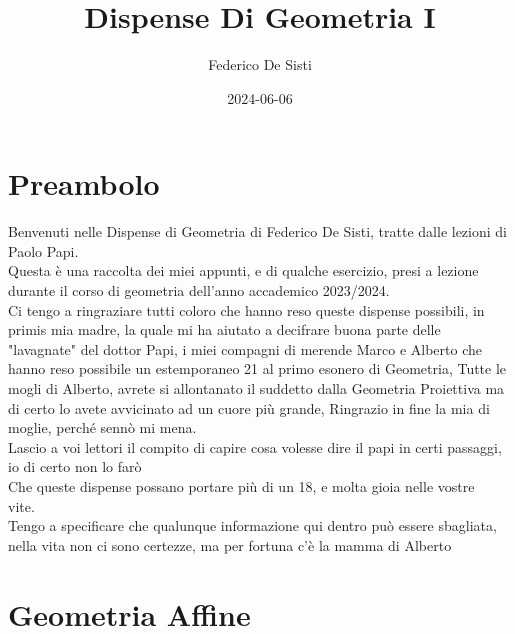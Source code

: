 \documentclass[12px]{article}
\title{Dispense Di Geometria I}
\date{2024-06-06}
\author{Federico De Sisti}
\begin{document}
	\maketitle
	\newpage
	\tableofcontents
	\newpage
	\section{Preambolo}
	Benvenuti nelle Dispense di Geometria di Federico De Sisti, tratte dalle lezioni di Paolo Papi.\\[10px]
	Questa è una raccolta dei miei appunti, e di qualche esercizio, presi a lezione durante il corso di geometria dell'anno accademico 2023/2024.\\[10px]
	Ci tengo a ringraziare tutti coloro che hanno reso queste dispense possibili, in primis mia madre, la quale mi ha aiutato a decifrare buona parte delle "lavagnate" del dottor Papi, i miei compagni di merende Marco e Alberto che hanno reso possibile un estemporaneo 21 al primo esonero di Geometria, Tutte le mogli di Alberto, avrete si allontanato il suddetto dalla Geometria Proiettiva ma di certo lo avete avvicinato ad un cuore più grande, Ringrazio in fine la mia di moglie, perché sennò mi mena.\\[10px]
	Lascio a voi lettori il compito di capire cosa volesse dire il papi in certi passaggi, io di certo non lo farò\\[10px]
	Che queste dispense possano portare più di un 18, e molta gioia nelle vostre vite.\vfill \ \\
	Tengo a specificare che qualunque informazione qui dentro può essere sbagliata, nella vita non ci sono certezze, ma per fortuna c'è la mamma di Alberto
	\newpage
	\section{Geometria Affine}
\end{document}
